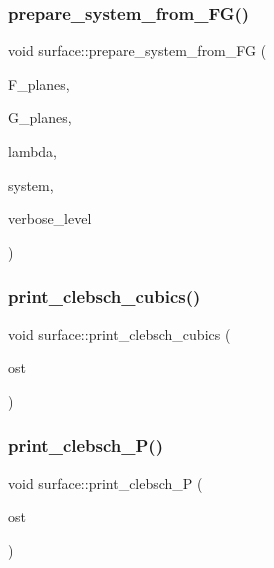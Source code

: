 \subsubsection{\texorpdfstring{prepare\+\_\+system\+\_\+from\+\_\+\+F\+G()}{prepare\_system\_from\_FG()}}
{\footnotesize\ttfamily void surface\+::prepare\+\_\+system\+\_\+from\+\_\+\+FG (\begin{DoxyParamCaption}\item[{\mbox{\hyperlink{galois_8h_a09fddde158a3a20bd2dcadb609de11dc}{I\+NT}} $\ast$}]{F\+\_\+planes,  }\item[{\mbox{\hyperlink{galois_8h_a09fddde158a3a20bd2dcadb609de11dc}{I\+NT}} $\ast$}]{G\+\_\+planes,  }\item[{\mbox{\hyperlink{galois_8h_a09fddde158a3a20bd2dcadb609de11dc}{I\+NT}}}]{lambda,  }\item[{\mbox{\hyperlink{galois_8h_a09fddde158a3a20bd2dcadb609de11dc}{I\+NT}} $\ast$\&}]{system,  }\item[{\mbox{\hyperlink{galois_8h_a09fddde158a3a20bd2dcadb609de11dc}{I\+NT}}}]{verbose\+\_\+level }\end{DoxyParamCaption})}

\mbox{\label{classsurface_a57b6dbcb5c8827ce0e745824c0cc6511}} 
\subsubsection{\texorpdfstring{print\+\_\+clebsch\+\_\+cubics()}{print\_clebsch\_cubics()}}
{\footnotesize\ttfamily void surface\+::print\+\_\+clebsch\+\_\+cubics (\begin{DoxyParamCaption}\item[{ostream \&}]{ost }\end{DoxyParamCaption})}

\mbox{\label{classsurface_a03826c4caeaabe0dc068ca6e1a07cf79}} 
\subsubsection{\texorpdfstring{print\+\_\+clebsch\+\_\+\+P()}{print\_clebsch\_P()}}
{\footnotesize\ttfamily void surface\+::print\+\_\+clebsch\+\_\+P (\begin{DoxyParamCaption}\item[{ostream \&}]{ost }\end{DoxyParamCaption})}


